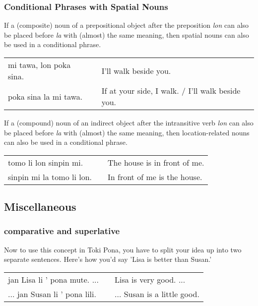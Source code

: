 \subsubsection*{Conditional Phrases with Spatial Nouns}
%
%

If a (composite) noun of a prepositional object after the preposition \textit{lon} can also be placed before \textit{la} with (almost) the same meaning, then spatial nouns can also be used in a conditional phrase. 

\begin{supertabular}{p{5,5cm}|ll}
mi tawa, lon poka sina.  && I'll walk beside you. \\
poka sina la mi tawa.    && If at your side, I walk. / I'll walk beside you.  \\
\end{supertabular} 

If a (compound) noun of an indirect object after the intransitive verb \textit{lon} can also be placed before \textit{la} with (almost) the same meaning, then location-related nouns can also be used in a conditional phrase. 

\begin{supertabular}{p{5,5cm}|ll}
tomo li lon sinpin mi.    && The house is in front of me. \\
sinpin mi la tomo li lon. && In front of me is the house. \\
\end{supertabular}

%
\subsection*{Miscellaneous}
%
%
\subsubsection*{comparative and superlative} 
%
%
Now to use this concept in Toki Pona, you have to split your idea up into two separate sentences. 
Here's how you'd say 'Lisa is better than Susan.'

\begin{supertabular}{p{5,5cm}|ll}
jan Lisa li ' pona mute. ...  && Lisa is very good. ... \\ %
... jan Susan li ' pona lili. && ... Susan is a little good. \\ %
\end{supertabular} 

